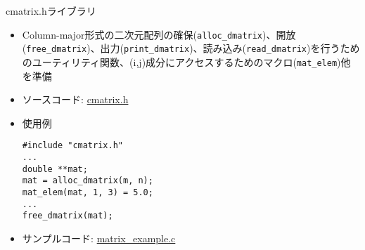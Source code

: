 \begin{frame}[t,fragile]{cmatrix.hライブラリ}
  \begin{itemize}
  \item Column-major形式の二次元配列の確保({\tt alloc\_dmatrix})、開放({\tt free\_dmatrix})、出力({\tt print\_dmatrix})、読み込み({\tt read\_dmatrix})を行うためのユーティリティ関数、(i,j)成分にアクセスするためのマクロ({\tt mat\_elem})他を準備
  \item ソースコード: \href{https://github.com/todo-group/computer-experiments/blob/master/exercise/matrix/cmatrix.h}{cmatrix.h}
  \item 使用例
\begin{lstlisting}
#include "cmatrix.h"
...
double **mat;
mat = alloc_dmatrix(m, n);
mat_elem(mat, 1, 3) = 5.0;
...
free_dmatrix(mat);
\end{lstlisting}
  \item サンプルコード: \href{https://github.com/todo-group/computer-experiments/blob/master/exercise/matrix/matrix_example.c}{matrix\_example.c}
  \end{itemize}
\end{frame}
